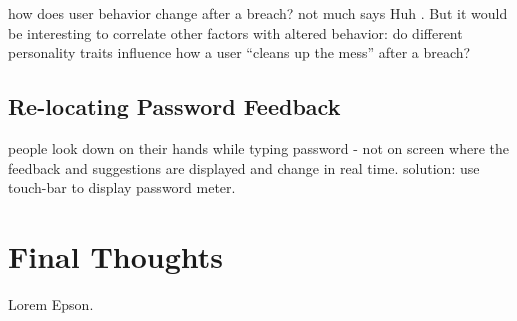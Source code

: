%
%
%
%
%

how does user behavior change after a breach? not much says Huh \etal \cite{Huh2017TooBusy}. But it would be interesting to correlate other factors with altered behavior: do different personality traits influence how a user ``cleans up the mess'' after a breach?

\subsection{Re-locating Password Feedback} people look down on their hands while typing password - not on screen where the feedback and suggestions are displayed and change in real time. solution: use touch-bar to display password meter.


\section{Final Thoughts}
Lorem Epson. 

